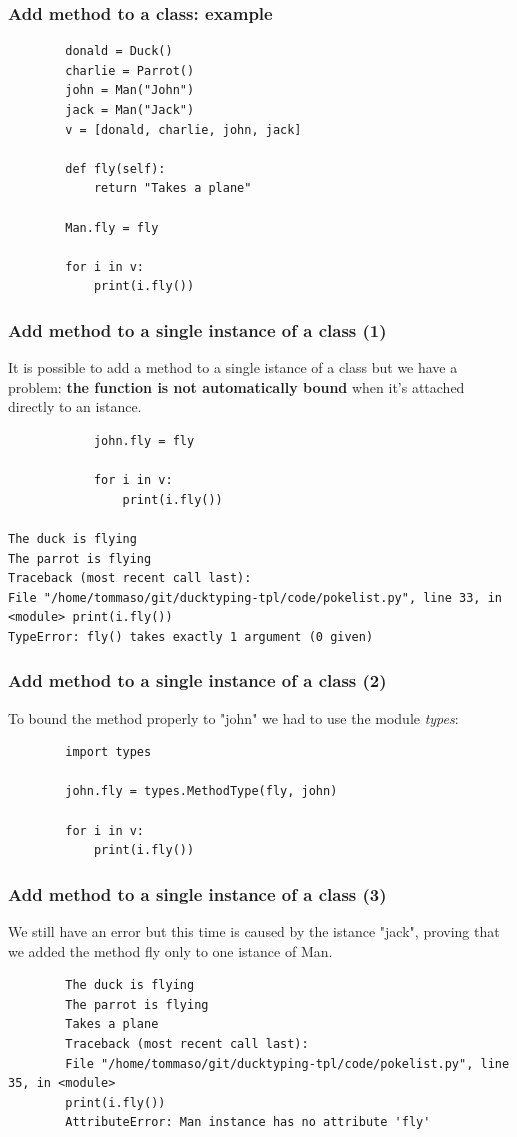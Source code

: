 \documentclass[xcolor ={table,usenames,dvipsnames}]{beamer}
\theoremstyle{definition}
\begin{document}
	\begin{frame}[fragile]
		\frametitle{Add method to a class: example}
		\begin{lstlisting}
		donald = Duck()
		charlie = Parrot()
		john = Man("John")
		jack = Man("Jack")
		v = [donald, charlie, john, jack]
		
		def fly(self):
			return "Takes a plane"
		
		Man.fly = fly
		
		for i in v:
			print(i.fly())
		\end{lstlisting}
	\end{frame}

	\begin{frame}[fragile]
		\frametitle{Add method to a single instance of a class (1)}
			It is possible to add a method to a single istance of a class but we have a problem: \textbf{the function is not automatically bound} when it's attached directly to an istance.
			
				\begin{lstlisting}
			john.fly = fly
			
			for i in v:
				print(i.fly())
				
The duck is flying
The parrot is flying
Traceback (most recent call last):
File "/home/tommaso/git/ducktyping-tpl/code/pokelist.py", line 33, in <module> print(i.fly())
TypeError: fly() takes exactly 1 argument (0 given)
			\end{lstlisting}
	\end{frame}
	
	\begin{frame}[fragile]
		\frametitle{Add method to a single instance of a class (2)}
			
		To bound the method properly to "john" we had to use the module \textit{types}:
		
		\begin{lstlisting}
		import types
		
		john.fly = types.MethodType(fly, john)
		
		for i in v:
			print(i.fly())
		\end{lstlisting}
	\end{frame}

	\begin{frame}[fragile]
		\frametitle{Add method to a single instance of a class (3)}
			We still have an error but this time is caused by the istance "jack", proving that we added the method fly only to one istance of Man. 
		
		\begin{lstlisting}
		The duck is flying
		The parrot is flying
		Takes a plane
		Traceback (most recent call last):
		File "/home/tommaso/git/ducktyping-tpl/code/pokelist.py", line 35, in <module>
		print(i.fly())
		AttributeError: Man instance has no attribute 'fly'
		\end{lstlisting}
	\end{frame}

	

		
	
	

	
	
	
	
	
	
	
	
	
	
	
\end{document}
